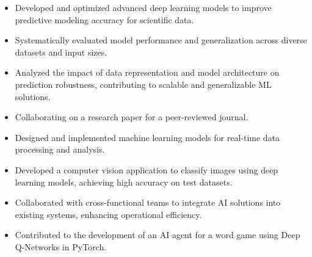 \documentclass[9pt,a4paper,ragged2e,withhyper]{altacv}
\begin{document}
\begin{paracol}{2}
            \begin{itemize}
                \item Developed and optimized advanced deep learning models to improve predictive modeling accuracy for scientific data.
                \item Systematically evaluated model performance and generalization across diverse datasets and input sizes.
                \item Analyzed the impact of data representation and model architecture on prediction robustness, contributing to scalable and generalizable ML solutions.
                \item Collaborating on a research paper for a peer-reviewed journal.
            \end{itemize}
            \vspace{0.5em}
            \begin{itemize}
                \item Designed and implemented machine learning models for real-time data processing and analysis.
                \item Developed a computer vision application to classify images using deep learning models, achieving high accuracy on test datasets.
                \item Collaborated with cross-functional teams to integrate AI solutions into existing systems, enhancing operational efficiency.
                \item Contributed to the development of an AI agent for a word game using Deep Q-Networks in PyTorch.
            \end{itemize}
            \vspace{0.5em}
        

\end{paracol}
\end{document}
